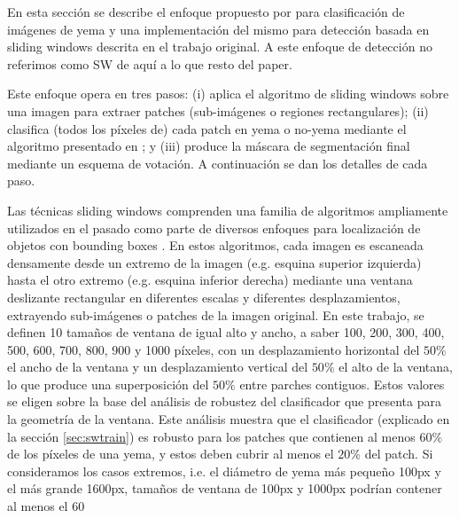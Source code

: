 \documentclass[a4paper,authoryear,review]{elsarticle}
\begin{document}
	En esta sección se describe el enfoque propuesto por \citet{perez2017image} para clasificación de imágenes de yema y una implementación del mismo para detección basada en sliding windows descrita en el trabajo original. A este enfoque de detección no referimos como SW de aquí a lo que resto del paper.
	
	Este enfoque opera en tres pasos: (i) aplica el algoritmo de sliding windows sobre una imagen para extraer patches (sub-imágenes o regiones rectangulares); (ii) clasifica (todos los píxeles de) cada patch en yema o no-yema mediante el algoritmo presentado en \citet{perez2017image}; y (iii) produce la máscara de segmentación final mediante un esquema de votación. A continuación se dan los detalles de cada paso.
	
	Las técnicas sliding windows comprenden una familia de algoritmos ampliamente utilizados en el pasado como parte de diversos enfoques para localización de objetos con bounding boxes \citep{divvala2009empirical, wang2009hog, chum2007exemplar, ferrari2007groups, dalal2005histograms, rowley1996human}. En estos algoritmos, cada imagen es escaneada densamente desde un extremo de la imagen (e.g. esquina superior izquierda) hasta el otro extremo (e.g. esquina inferior derecha) mediante una ventana deslizante rectangular en diferentes escalas y diferentes desplazamientos, extrayendo sub-imágenes o patches de la imagen original. En este trabajo, se definen 10 tamaños de ventana de igual alto y ancho, a saber 100, 200, 300, 400, 500, 600, 700, 800, 900 y 1000 píxeles, con un desplazamiento horizontal del $50\%$ el ancho de la ventana y un desplazamiento vertical del $50\%$ el alto de la ventana, lo que produce una superposición del $50\%$ entre parches contiguos. Estos valores se eligen sobre la base del análisis de robustez del clasificador que presenta \citet{perez2017image} para la geometría de la ventana. Este análisis muestra que el clasificador (explicado en la sección \ref{sec:swtrain}) es robusto para los patches que contienen al menos $60\%$ de los píxeles de una yema, y estos deben cubrir al menos el $20\%$ del patch. Si consideramos los casos extremos, i.e. el diámetro de yema más pequeño 100px y el más grande 1600px, tamaños de ventana de 100px y 1000px podrían contener al menos el 60%
	
\end{document}
